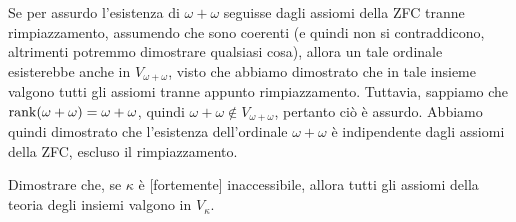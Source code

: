 \begin{soln}
	Se per assurdo l'esistenza di $\omega + \omega$ seguisse dagli assiomi della ZFC tranne rimpiazzamento, assumendo che sono coerenti (e quindi non si contraddicono, altrimenti potremmo dimostrare qualsiasi cosa),
	allora un tale ordinale esisterebbe anche in $V_{\omega + \omega}$, visto che abbiamo dimostrato che in tale insieme valgono tutti gli assiomi tranne appunto rimpiazzamento.
	Tuttavia, sappiamo che $\operatorname{rank}(\omega + \omega) = \omega + \omega$, quindi $\omega + \omega \not \in V_{\omega + \omega}$, pertanto ciò è assurdo. Abbiamo quindi dimostrato che l'esistenza dell'ordinale $\omega + \omega$ è indipendente dagli assiomi della ZFC, escluso il rimpiazzamento.
\end{soln}

\begin{exercise}
	Dimostrare che, se $\kappa$ è [fortemente] inaccessibile, allora tutti gli assiomi della teoria degli insiemi valgono in $V_\kappa$.
\end{exercise}

